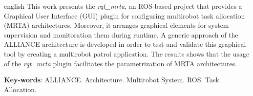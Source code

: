 \begin{resumo}[Abstract]
    \begin{otherlanguage*}{english}
        This work presents the \textit{rqt\_mrta}, an ROS-based project that provides a Graphical User Interface (GUI) plugin for configuring multirobot task allocation (MRTA) architectures. Moreover, it arranges graphical elements for system supervision and monitoration them during runtime. A generic approach of the ALLIANCE architecture is developed in order to test and validate this graphical tool by creating a multirobot patrol application. The results shows that the usage of the \textit{rqt\_mrta} plugin facilitates the parametrization of MRTA architectures.
        
        \vspace{\onelineskip}
        
        \noindent 
        \textbf{Key-words}: ALLIANCE. Architecture. Multirobot System. ROS. Task Allocation. 
    \end{otherlanguage*}
\end{resumo}
\newpage